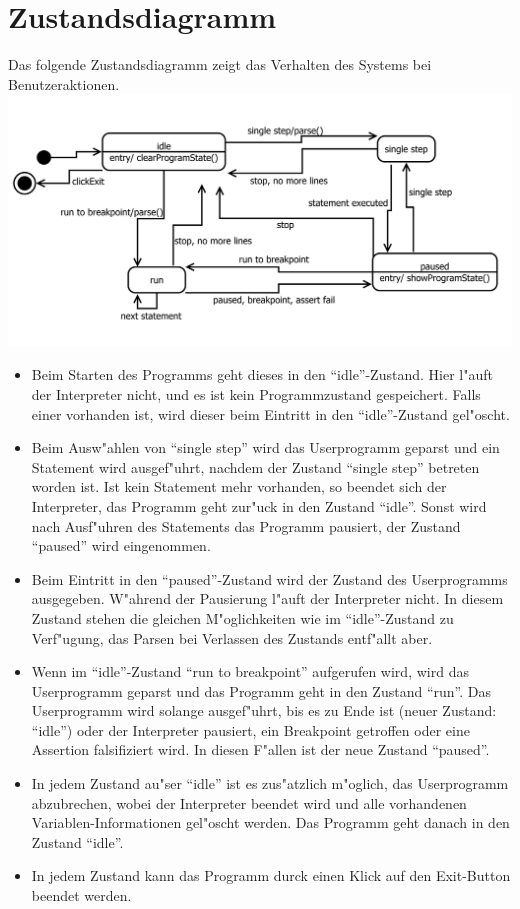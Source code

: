 \documentclass[10pt,a4paper,titlepage]{article}
\begin{document}
\section{Zustandsdiagramm}

Das folgende Zustandsdiagramm zeigt das Verhalten des Systems bei Benutzeraktionen. \\
\includegraphics[scale=0.9]{images/Zustand.pdf}
\begin{itemize}
\item Beim Starten des Programms geht dieses in den "`idle"'-Zustand. Hier l"auft der Interpreter nicht, und es ist kein Programmzustand gespeichert. Falls einer vorhanden ist, wird dieser beim Eintritt in den "`idle"'-Zustand gel"oscht.
\item Beim Ausw"ahlen von "`single step"' wird das Userprogramm geparst und ein Statement wird ausgef"uhrt, nachdem der Zustand "`single step"' betreten worden ist. Ist kein Statement mehr vorhanden, so beendet sich der Interpreter, das Programm geht zur"uck in den Zustand "`idle"'. Sonst wird nach Ausf"uhren des Statements das Programm pausiert, der Zustand "`paused"' wird eingenommen.
\item Beim Eintritt in den "`paused"'-Zustand wird der Zustand des Userprogramms ausgegeben. W"ahrend der Pausierung l"auft der Interpreter nicht. In diesem Zustand stehen die gleichen M"oglichkeiten wie im "`idle"'-Zustand zu Verf"ugung, das Parsen bei Verlassen des Zustands entf"allt aber.
\item Wenn im "`idle"'-Zustand "`run to breakpoint"' aufgerufen wird, wird das Userprogramm geparst und das Programm geht in den Zustand "`run"'. Das Userprogramm wird solange ausgef"uhrt, bis es zu Ende ist (neuer Zustand: "`idle"') oder der Interpreter pausiert, ein Breakpoint getroffen oder eine Assertion falsifiziert wird. In diesen F"allen ist der neue Zustand "`paused"'.
\item In jedem Zustand au"ser "`idle"' ist es zus"atzlich m"oglich, das Userprogramm abzubrechen, wobei der Interpreter beendet wird und alle vorhandenen Variablen-Informationen gel"oscht werden. Das Programm geht danach in den Zustand "`idle"'.
\item In jedem Zustand kann das Programm durck einen Klick auf den Exit-Button beendet werden.
\end{itemize}
\newpage
\end{document}
